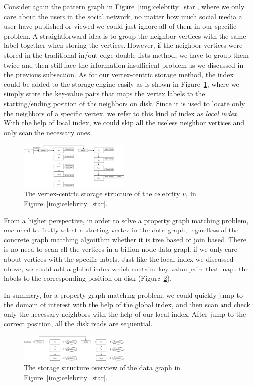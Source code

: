 Consider again the pattern graph in Figure~\ref{img:celebrity_star}, where we only care about the users in the social network,
no matter how much social media a user have published or viewed we could just ignore all of them in our specific problem.
A straightforward idea is to group the neighbor vertices with the same label together when storing the vertices.
However, if the neighbor vertices were stored in the traditional in/out-edge double lists method,
we have to group them twice and then still face the information insufficient problem as we discussed in the previous subsection.
As for our vertex-centric storage method,
the index could be added to the storage engine easily as is shown in Figure~\ref{img:data_neighbors},
where we simply store the key-value pairs that maps the vertex labels to the starting/ending position of the neighbors on disk.
Since it is used to locate only the neighbors of a specific vertex, we refer to this kind of index as \emph{local index}.
With the help of local index, we could skip all the useless neighbor vertices and only scan the necessary ones.
\begin{figure}[ht]
  \centering
  \includegraphics[width=0.48\textwidth]{img/data_neighbors.pdf}
  \caption{The vertex-centric storage structure of the celebrity $v_1$ in Figure~\ref{img:celebrity_star}.}\label{img:data_neighbors}
\end{figure}

From a higher perspective, in order to solve a property graph matching problem,
one need to firstly select a starting vertex in the data graph,
regardless of the concrete graph matching algorithm whether it is tree based or join based.
There is no need to scan all the vertices in a billion node data graph if we only care about vertices with the specific labels.
Just like the local index we discussed above, we could add a global index which contains key-value pairs that maps the labels to the corresponding position on disk (Figure~\ref{img:data_vertices}).

In summery, for a property graph matching problem, we could quickly jump to the domain of interest with the help of the global index, and then scan and check only the necessary neighbors with the help of our local index.
After jump to the correct position, all the disk reads are sequential.
\begin{figure}[ht]
  \centering
  \includegraphics[width=0.48\textwidth]{img/data_vertices.pdf}
  \caption{The storage structure overview of the data graph in Figure~\ref{img:celebrity_star}.}\label{img:data_vertices}
\end{figure}
